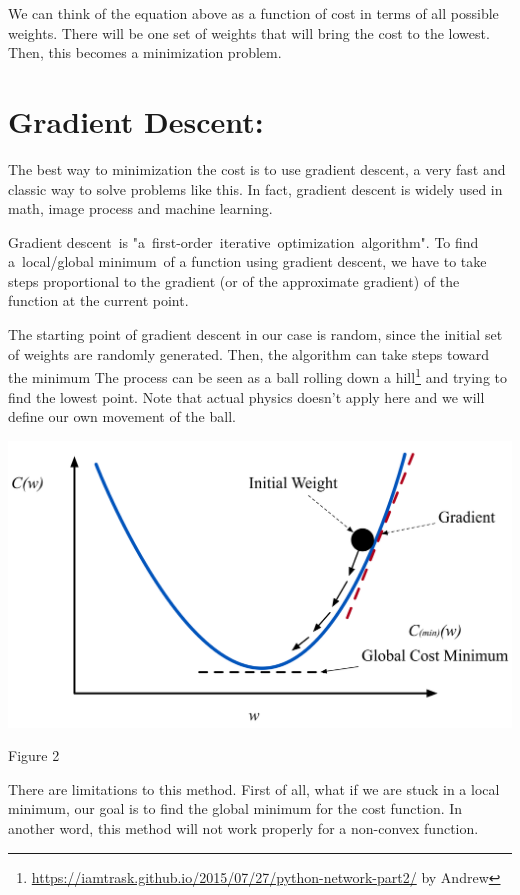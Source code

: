 \documentclass[]{article}
\begin{document}
\begin{multicols}{2}
We can think of the equation above as a function of cost in terms of all
possible weights. There will be one set of weights that will bring the
cost to the lowest. Then, this becomes a minimization problem.

\section{Gradient Descent:}

The best way to minimization the cost is to use gradient descent, a very
fast and classic way to solve problems like this. In fact, gradient
descent is widely used in math, image process and machine learning.

Gradient descent~is "a~first-order~iterative~optimization~algorithm". To
find a~local/global minimum~of a function using gradient descent, we have to take
steps proportional to the gradient (or of the
approximate gradient) of the function at the current point.

The starting point of gradient descent in our case is random, since the initial set of weights are randomly generated. Then, the algorithm can take steps toward the minimum The process can be seen as a ball rolling down a
hill\footnote{\url{https://iamtrask.github.io/2015/07/27/python-network-part2/}
  by Andrew}
and trying to find the lowest point. Note that actual physics doesn't
apply here and we will define our own movement of the ball.

\centerline{\includegraphics[width=1\linewidth]{gd} }
\centerline{Figure 2}
\vspace{0.5cm}

There are limitations to this method. First of all, what if we are stuck
in a local minimum, our goal is to find the global minimum for the cost
function. In another word, this method will not work properly for a non-convex
function. 


\end{multicols}
\end{document}
